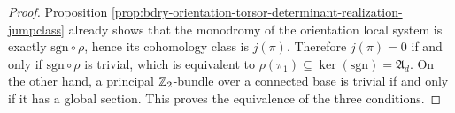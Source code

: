 \begin{proof}
Proposition \ref{prop:bdry-orientation-torsor-determinant-realization-jumpclass} already shows that the monodromy of the orientation local system is exactly \(\mathrm{sgn}\circ\rho\), hence its cohomology class is \(j(\pi)\).
Therefore \(j(\pi)=0\) if and only if \(\mathrm{sgn}\circ\rho\) is trivial, which is equivalent to \(\rho(\pi_1)\subseteq \ker(\mathrm{sgn})=\mathfrak A_d\).
On the other hand, a principal \(\mathbb{Z}_2\)-bundle over a connected base is trivial if and only if it has a global section.
This proves the equivalence of the three conditions. \qedhere
\end{proof}


\endinput
